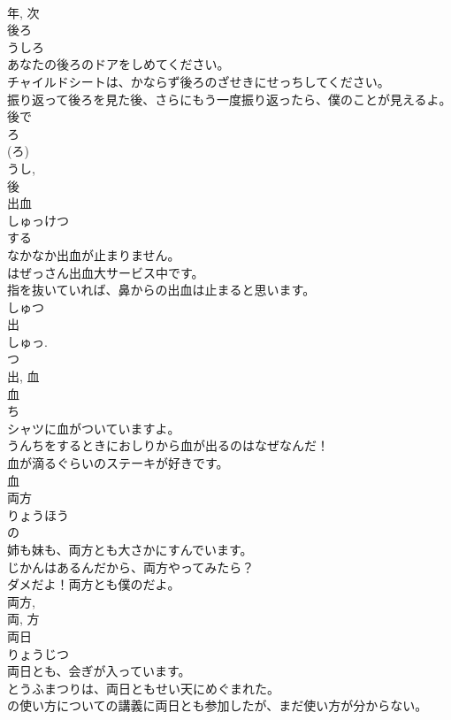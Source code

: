 \documentclass[8pt]{extreport}
\begin{document}
\begin{CJK}{UTF8}{min}
\\	年, 次	
\\	後ろ	
\\	うしろ	
\\	あなたの後ろのドアをしめてください。	
\\	チャイルドシートは、かならず後ろのざせきにせっちしてください。	
\\	振り返って後ろを見た後、さらにもう一度振り返ったら、僕のことが見えるよ。	
\\	後で 
\\	ろ 
\\	(ろ) 
\\	うし, 
\\	後	
\\	出血	
\\	しゅっけつ	
\\	する 
\\	なかなか出血が止まりません。	
\\	はぜっさん出血大サービス中です。	
\\	指を抜いていれば、鼻からの出血は止まると思います。	
\\	しゅつ 
\\	出 
\\	しゅっ. 
\\	つ 
\\	出, 血	
\\	血	
\\	ち	
\\	シャツに血がついていますよ。	
\\	うんちをするときにおしりから血が出るのはなぜなんだ！	
\\	血が滴るぐらいのステーキが好きです。	
\\	血	
\\	両方	
\\	りょうほう	
\\	の 
\\	姉も妹も、両方とも大さかにすんでいます。	
\\	じかんはあるんだから、両方やってみたら？	
\\	ダメだよ！両方とも僕のだよ。	
\\	両方, 
\\	両, 方	
\\	両日	
\\	りょうじつ	
\\	両日とも、会ぎが入っています。	
\\	とうふまつりは、両日ともせい天にめぐまれた。	
\\	の使い方についての講義に両日とも参加したが、まだ使い方が分からない。	

\end{CJK}
\end{document}
